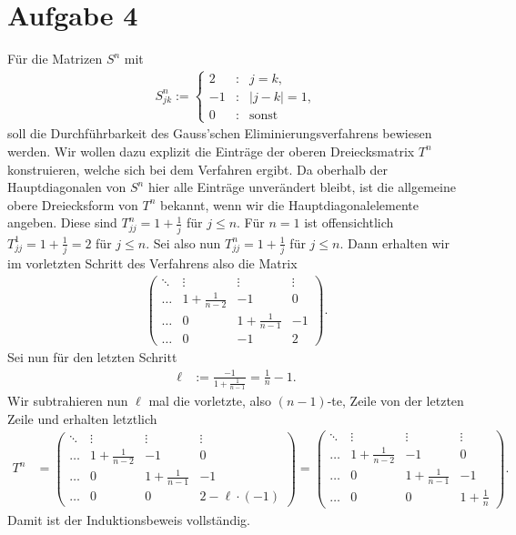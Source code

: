 \documentclass[english, parskip=full]{scrartcl}
\newcommand{\tecxt}{}
\begin{document}
\section*{Aufgabe 4}
Für die Matrizen $S^n$ mit
\begin{align}
S_{jk}^n := \left\{\begin{matrix}
2 & : & j=k, \\
-1 & : & |j-k| = 1,\\
0 & : & \tecxt\text{sonst}
\end{matrix} \right. 
\end{align}
soll die Durchführbarkeit des Gauss'schen Eliminierungsverfahrens bewiesen werden.
Wir wollen dazu explizit die Einträge der oberen Dreiecksmatrix $T^n$ konstruieren, welche sich bei dem Verfahren ergibt. 
Da oberhalb der Hauptdiagonalen von $S^n$ hier alle Einträge unverändert bleibt, ist die allgemeine obere Dreiecksform von $T^n$ bekannt, wenn wir die Hauptdiagonalelemente angeben.
Diese sind $T_{jj}^n = 1 + \frac{1}{j}$ für $j\le n$.
Für $n=1$ ist offensichtlich $T_{jj}^1 = 1 + \frac{1}{j} = 2$ für $j\le n$.
Sei also nun $T_{jj}^n = 1 + \frac{1}{j}$ für $j\le n$.
Dann erhalten wir im vorletzten Schritt des Verfahrens also die Matrix
\begin{align}
\begin{pmatrix}
\ddots & \vdots & \vdots & \vdots \\
\dots & 1 + \frac{1}{n-2} & -1 & 0 \\
\dots & 0 & 1 + \frac{1}{n-1} & -1 \\
\dots & 0 & -1 & 2
\end{pmatrix}.
\end{align}
Sei nun für den letzten Schritt
\begin{align}
\ell &:= \frac{-1}{1 + \frac{1}{n-1}} = \frac{1}{n} - 1.
\end{align}
Wir subtrahieren nun $\ell$ mal die vorletzte, also $(n-1)$-te, Zeile von der letzten Zeile und erhalten letztlich
\begin{align}
T^n &= \begin{pmatrix}
\ddots & \vdots & \vdots & \vdots \\
\dots & 1 + \frac{1}{n-2} & -1 & 0 \\
\dots & 0 & 1 + \frac{1}{n-1} & -1 \\
\dots & 0 & 0 & 2 - \ell \cdot (-1)
\end{pmatrix} = \begin{pmatrix}
\ddots & \vdots & \vdots & \vdots \\
\dots & 1 + \frac{1}{n-2} & -1 & 0 \\
\dots & 0 & 1 + \frac{1}{n-1} & -1 \\
\dots & 0 & 0 & 1 + \frac{1}{n}
\end{pmatrix}.
\end{align}
Damit ist der Induktionsbeweis vollständig.


\end{document}
